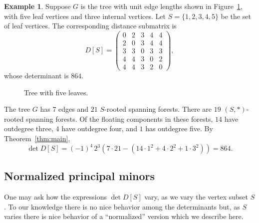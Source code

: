 \documentclass[12pt]{amsart}
\theoremstyle{definition}
\newtheorem*{eg*}{Example}
\begin{document}
\begin{eg*}
Suppose $G$ is the tree with unit edge lengths shown in Figure~\ref{fig:tree-5}, with five leaf vertices and three internal vertices.
Let $S=\{1,2,3,4,5\}$ be the set of leaf vertices. 
The corresponding distance submatrix is
\[
	D[S] = \begin{pmatrix}
	0 & 2 & 3 & 4 & 4 \\
	2 & 0 & 3 & 4 & 4 \\
	3 & 3 & 0 & 3 & 3 \\
	4 & 4 & 3 & 0 & 2 \\
	4 & 4 & 3 & 2 & 0
	\end{pmatrix},
\]
whose determinant is $864$.

\begin{figure}[h]
\centering
{}
\caption{Tree with five leaves.}
\label{fig:tree-5}
\end{figure}

The tree $G$ has $7$ edges and $21$ $S$-rooted spanning forests.
There are $19$ $(S, *)$-rooted spanning forests. 
Of the floating components in these forests, $14$ have outdegree three, $4$ have outdegree four, and $1$ has outdegree five.
By Theorem~\ref{thm:main},
\[
	\det D[S] 
	= (-1)^4\, 2^3 \left( 7 \cdot 21 - (14 \cdot 1^2 + 4 \cdot 2^2 + 1 \cdot 3^2) \right) = 864.
\]
\end{eg*}

\subsection{Normalized principal minors}\label{sec:Normalized principal minors}
One may ask how the expressions $\det D[S]$ vary, as we vary the vertex subset $S$.
To our knowledge there is no nice behavior among the determinants but, as $S$ varies there is nice behavior of a ``normalized'' version which we describe here.
\end{document}
